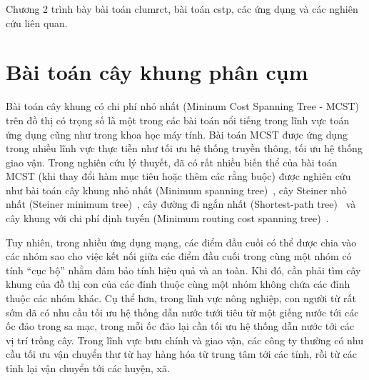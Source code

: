 {}
Chương 2 trình bày bài toán \gls{clumrct}, bài toán \gls{cstp}, các ứng dụng và các nghiên cứu liên quan.

\section{Bài toán cây khung phân cụm} \label{chap_coso:sec:gioiThieuCayKhungPhanCum}
Bài toán cây khung có chi phí nhỏ nhất (Mininum Cost Spanning Tree - MCST) trên đồ thị có trọng số là một trong các bài toán nổi tiếng trong lĩnh vực toán ứng dụng cũng như trong khoa học máy tính. Bài toán MCST được ứng dụng trong nhiều lĩnh vực thực tiễn như tối ưu hệ thống truyền thông, tối ưu hệ thống giao vận. Trong nghiên cứu lý thuyết, đã có rất nhiều biến thể của bài toán MCST (khi thay đổi hàm mục tiêu hoặc thêm các rằng buộc) được nghiên cứu như bài toán cây khung nhỏ nhất (Minimum spanning tree)~\cite{raidl_edge_2003, khuller1995balancing}, cây Steiner nhỏ nhất (Steiner minimum tree)~\cite{winter1997euclidean}, cây đường đi ngắn nhất (Shortest-path tree)~\cite{dial1979computational, khuller1995balancing} và cây khung với chi phí định tuyến (Minimum routing cost spanning tree)~\cite{julstrom2005blob}.

Tuy nhiên, trong nhiều ứng dụng mạng, các điểm đầu cuối có thể được chia vào các nhóm sao cho việc kết nối giữa các điểm đầu cuối trong cùng một nhóm có tính “cục bộ” nhằm đảm bảo tính hiệu quả và an toàn. Khi đó, cần phải tìm cây khung của đồ thị con của các đỉnh thuộc cùng một nhóm không chứa các đỉnh thuộc các nhóm khác. Cụ thể hơn, trong lĩnh vực nông nghiệp, con người từ rất sớm đã có nhu cầu tối ưu hệ thống dẫn nước tưới tiêu từ một giếng nước tới các ốc đảo trong sa mạc, trong mỗi ốc đảo lại cần tối ưu hệ thống dẫn nước tới các vị trí trồng cây. Trong lĩnh vực bưu chính và giao vận, các công ty thường có nhu cầu tối ưu vận chuyển thư từ hay hàng hóa từ trung tâm tới các tỉnh, rồi từ các tỉnh lại vận chuyển tới các huyện, xã.

